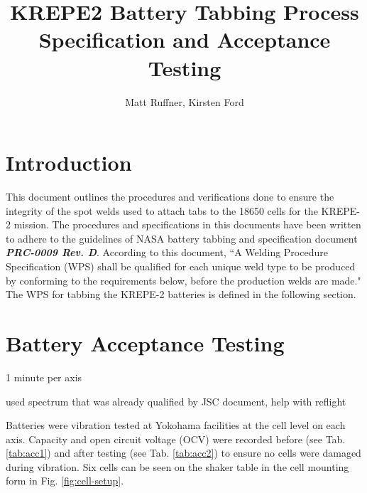 \documentclass{article}
\title{KREPE2 Battery Tabbing Process Specification and Acceptance Testing}
\author{Matt Ruffner, Kirsten Ford}
\date{}
\begin{document}
\maketitle
\tableofcontents
\listoffigures
\listoftables
\newpage


\section{Introduction}
This document outlines the procedures and verifications done to ensure the integrity of the spot welds used to attach tabs to the 18650 cells for the KREPE-2 mission. The procedures and specifications in this documents have been written to adhere to the guidelines of NASA battery tabbing and specification document \textit{\textbf{PRC-0009 Rev. D}}. According to this document, ``A Welding Procedure Specification (WPS) shall be qualified for each unique weld type to be produced by conforming to the requirements below, before the production welds are made." The WPS for tabbing the KREPE-2 batteries is defined in the following section. 


\section{Battery Acceptance Testing}

1 minute per axis

used spectrum that was already qualified by JSC document, help with reflight

Batteries were vibration tested at Yokohama facilities at the cell level on each axis. Capacity and open circuit voltage (OCV) were recorded before (see Tab. \ref{tab:acc1}) and after testing (see Tab. \ref{tab:acc2}) to ensure no cells were damaged during vibration. Six cells can be seen on the shaker table in the cell mounting form in Fig. \ref{fig:cell-setup}.
\end{document}
